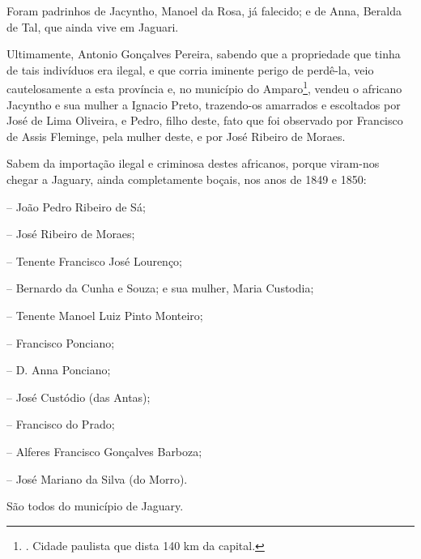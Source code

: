 Foram padrinhos de Jacyntho, Manoel da Rosa, já falecido; e de Anna,
Beralda de Tal, que ainda vive em Jaguari.

Ultimamente, Antonio Gonçalves Pereira, sabendo que a propriedade que
tinha de tais indivíduos era ilegal, e que corria iminente perigo de
perdê-la, veio cautelosamente a esta província e, no município do
Amparo\footnote{. Cidade paulista que dista 140 km da capital.}, vendeu
o africano Jacyntho e sua mulher a Ignacio Preto, trazendo-os amarrados
e escoltados por José de Lima Oliveira, e Pedro, filho deste, fato que
foi observado por Francisco de Assis Fleminge, pela mulher deste, e por
José Ribeiro de Moraes.

Sabem da importação ilegal e criminosa destes africanos, porque
viram-nos chegar a Jaguary, ainda completamente boçais, nos anos de 1849
e 1850:

-- João Pedro Ribeiro de Sá;

-- José Ribeiro de Moraes;

-- Tenente Francisco José Lourenço;

-- Bernardo da Cunha e Souza; e sua mulher, Maria Custodia;

-- Tenente Manoel Luiz Pinto Monteiro;

-- Francisco Ponciano;

-- D. Anna Ponciano;

-- José Custódio (das Antas);

-- Francisco do Prado;

-- Alferes Francisco Gonçalves Barboza;

-- José Mariano da Silva (do Morro).

São todos do município de Jaguary.

